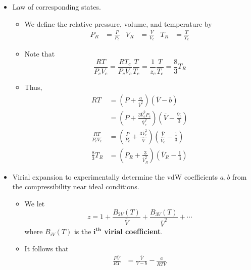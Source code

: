 \documentclass[../notes.tex]{subfiles}
\begin{document}
\begin{itemize}
\begin{itemize}
\begin{itemize}
        \end{itemize}
    \end{itemize}
    \item Law of corresponding states.
    \begin{itemize}
        \item We define the relative pressure, volume, and temperature by
        \begin{align*}
            P_R &= \frac{P}{P_c}&
            V_R &= \frac{V}{V_c}&
            T_R &= \frac{T}{T_c}
        \end{align*}
        \item Note that
        \begin{equation*}
            \frac{RT}{P_cV_c} = \frac{RT_c}{P_cV_c}\frac{T}{T_c}
            = \frac{1}{z_c}\frac{T}{T_c}
            = \frac{8}{3}T_R
        \end{equation*}
        \item Thus,
        \begin{align*}
            RT &= \left( P+\frac{a}{\overline{V}^2} \right)(\overline{V}-b)\\
            &= \left( P+\frac{3\overline{V}_c^2P_c}{\overline{V}_c^2} \right)\left( \overline{V}-\frac{\overline{V}_c}{3} \right)\\
            \frac{RT}{P_cV_c} &= \left( \frac{P}{P_c}+\frac{3\overline{V}_c^2}{\overline{V}} \right)\left( \frac{\overline{V}}{\overline{V}_c}-\frac{1}{3} \right)\\
            \frac{8}{3}T_R &= \left( P_R+\frac{3}{\overline{V}_R^2} \right)\left( \overline{V}_R-\frac{1}{3} \right)
        \end{align*}
    \end{itemize}
    \item Virial expansion to experimentally determine the vdW coefficients $a,b$ from the compressibility near ideal conditions.
    \begin{itemize}
        \item We let
        \begin{equation*}
            z = 1+\frac{B_{2V}(T)}{\overline{V}}+\frac{B_{3V}(T)}{\overline{V}^2}+\cdots
        \end{equation*}
        where $B_{iV}(T)$ is the \textbf{$\bm{i^\textbf{th}}$ virial coefficient}.
        \item It follows that
        \begin{align*}
            \frac{P\overline{V}}{RT} &= \frac{\overline{V}}{V-b}-\frac{a}{RT\overline{V}}\\

\end{align*}
\end{itemize}
\end{itemize}
\end{document}
